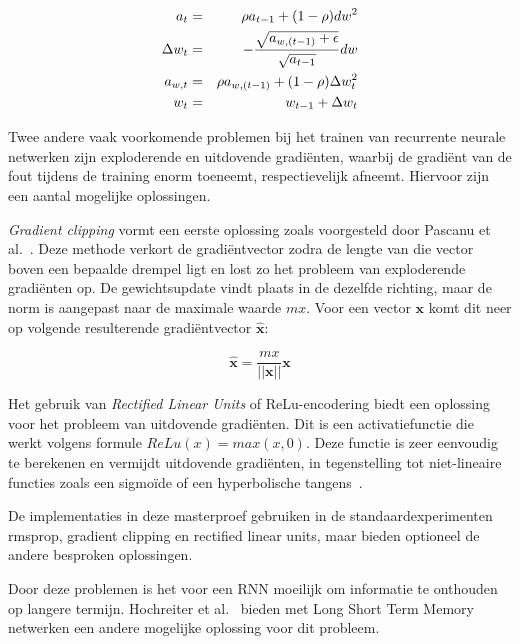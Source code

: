 \begin{eqnarray}
\vspace{-3mm}
    \label{adadelta:start}
    a_t & = & \rho  a_{t-1} + (1 - \rho)dw^2 \\
    \Delta w_t & = & - \frac{\sqrt{a_{w,(t-1)} + \epsilon}}{\sqrt{a_{t-1}}}dw \\
    a_{w,t} & = & \rho  a_{w,(t-1)} + (1 - \rho)\Delta w_t^2 \\
    w_t & = & w_{t-1} + \Delta w_t
    \label{formule:adadelta}
    \vspace{-3mm}
\end{eqnarray}


Twee andere vaak voorkomende problemen bij het trainen van recurrente neurale netwerken zijn exploderende en uitdovende gradi\"enten, waarbij de gradi\"ent van de fout tijdens de training enorm toeneemt, respectievelijk afneemt. Hiervoor zijn een aantal mogelijke oplossingen.

\emph{Gradient clipping} vormt een eerste oplossing zoals voorgesteld door Pascanu et al.~\cite{Pascanu2012}. Deze methode verkort de gradi\"entvector zodra de lengte van die vector boven een bepaalde drempel ligt en lost zo het probleem van exploderende gradi\"enten op. De gewichtsupdate vindt plaats in de dezelfde richting, maar de norm is aangepast naar de maximale waarde $mx$. Voor een vector $\mathbf{x}$ komt dit neer op volgende resulterende gradi\"entvector $\mathbf{\hat{x}}$:

\begin{equation}
    \mathbf{\hat{x}} = \frac{mx}{||\mathbf{x}||}\mathbf{x}
\end{equation}

Het gebruik van \emph{Rectified Linear Units} of ReLu-encodering biedt een oplossing voor het probleem van uitdovende gradi\"enten. Dit is een activatiefunctie die werkt volgens formule $ReLu(x) = max(x,0)$. Deze functie is zeer eenvoudig te berekenen en vermijdt uitdovende gradi\"enten, in tegenstelling tot niet-lineaire functies zoals een sigmo\"ide of een hyperbolische tangens~\cite{Glorot2011}.

De implementaties in deze masterproef gebruiken in de standaardexperimenten rmsprop, gradient clipping en rectified linear units, maar bieden optioneel de andere besproken oplossingen.

Door deze problemen is het voor een RNN moeilijk om informatie te onthouden op langere termijn. Hochreiter et al.~\cite{SeppHochreiter1997} bieden met Long Short Term Memory netwerken een andere mogelijke oplossing voor dit probleem.

